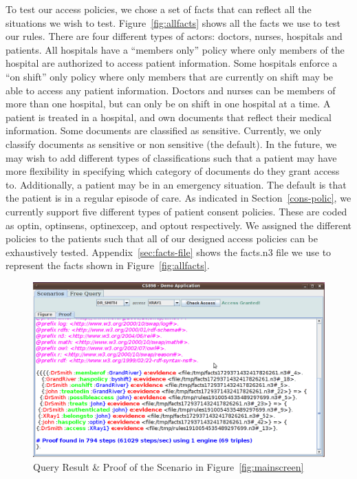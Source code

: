 \documentclass[conference]{IEEEtran}
\begin{document}
To test our access policies, we chose a set of facts that can reflect all the situations we wish to test. Figure~\ref{fig:allfacts} shows all the facts we use
to test our rules. There are four different types of actors: doctors, nurses, hospitals and patients. All hospitals have a ``members only'' policy where only
members of the hospital are authorized to access patient information. Some hospitals enforce a ``on shift'' only policy where only members that are currently on
shift may be able to access any patient information. Doctors and nurses can be members of more than one hospital, but can only be on shift in one hospital at a
time. A patient is treated in a hospital, and own documents that reflect their medical information. Some documents are classified as sensitive. Currently, we
only classify documents as sensitive or non sensitive (the default). In the future, we may wish to add different types of classifications such that a patient
may have more flexibility in specifying which category of documents do they grant access to. Additionally, a patient may be in an emergency situation. The
default is that the patient is in a regular episode of care. As indicated in Section~\ref{cons-polic}, we currently support five different types of patient
consent policies. These are coded as optin, optinsens, optinexcep, and optout respectively. We assigned the different policies to the patients such that all of
our designed access policies can be exhaustively tested. 
Appendix~\ref{sec:facts-file} shows the facts.n3 file we use to represent the facts shown in Figure~\ref{fig:allfacts}.

\begin{figure}[!t]
 \centering
 \includegraphics[scale=0.25,keepaspectratio=true]{./proof.png}
 \caption{Query Result \& Proof of the Scenario in Figure~\ref{fig:mainscreen}}
 \label{fig:proof}
\end{figure}
\end{document}
